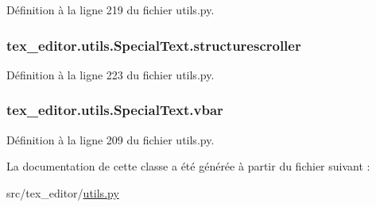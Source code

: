 Définition à la ligne 219 du fichier utils.\+py.

\hypertarget{classtex__editor_1_1utils_1_1_special_text_aa8d9c577e09d0f6ad96671552ce38a64}{}
\subsubsection[{structurescroller}]{\setlength{\rightskip}{0pt plus 5cm}tex\+\_\+editor.\+utils.\+Special\+Text.\+structurescroller}\label{classtex__editor_1_1utils_1_1_special_text_aa8d9c577e09d0f6ad96671552ce38a64}


Définition à la ligne 223 du fichier utils.\+py.

\hypertarget{classtex__editor_1_1utils_1_1_special_text_aa01037a9c0d49d806abbc9822c60cc35}{}
\subsubsection[{vbar}]{\setlength{\rightskip}{0pt plus 5cm}tex\+\_\+editor.\+utils.\+Special\+Text.\+vbar}\label{classtex__editor_1_1utils_1_1_special_text_aa01037a9c0d49d806abbc9822c60cc35}


Définition à la ligne 209 du fichier utils.\+py.



La documentation de cette classe a été générée à partir du fichier suivant \+:\begin{DoxyCompactItemize}
\item 
src/tex\+\_\+editor/\hyperlink{utils_8py}{utils.\+py}\end{DoxyCompactItemize}
